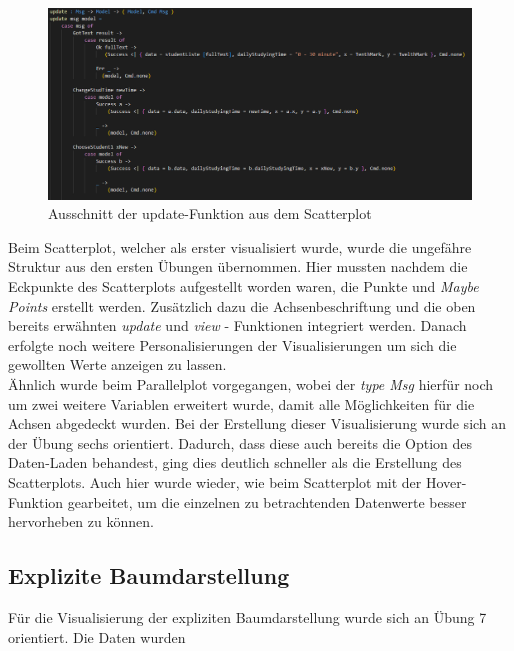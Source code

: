 \documentclass[usegeometry=true]{scrartcl}
\begin{document}
\begin{figure}[h]
\begin{center}
	\includegraphics[scale=.5]{updateScatter.png}
	\caption{Ausschnitt der update-Funktion aus dem Scatterplot}
	\label{updateScatter}
\end{center}
\end{figure}






\noindent Beim Scatterplot, welcher als erster visualisiert wurde, wurde die ungefähre Struktur aus den ersten Übungen übernommen. Hier mussten nachdem die Eckpunkte des Scatterplots aufgestellt worden waren, die Punkte und \textit{Maybe Points} erstellt werden. Zusätzlich dazu die Achsenbeschriftung und die oben bereits erwähnten \textit{update} und \textit{view} - Funktionen integriert werden. Danach erfolgte noch weitere Personalisierungen der Visualisierungen um sich die gewollten Werte anzeigen zu lassen.\\

\noindent Ähnlich wurde beim Parallelplot vorgegangen, wobei der \textit{type Msg} hierfür noch um zwei weitere Variablen erweitert wurde, damit alle Möglichkeiten für die Achsen abgedeckt wurden. Bei der Erstellung dieser Visualisierung wurde sich an der Übung sechs orientiert. Dadurch, dass diese auch bereits die Option des Daten-Laden behandest, ging dies deutlich schneller als die Erstellung des Scatterplots. Auch hier wurde wieder, wie beim Scatterplot mit der Hover-Funktion gearbeitet, um die einzelnen zu betrachtenden Datenwerte besser hervorheben zu können.


\subsection{Explizite Baumdarstellung}
\label{ImplBaum}

\noindent Für die Visualisierung der expliziten Baumdarstellung wurde sich an Übung 7 orientiert. Die Daten wurden 
\end{document}
